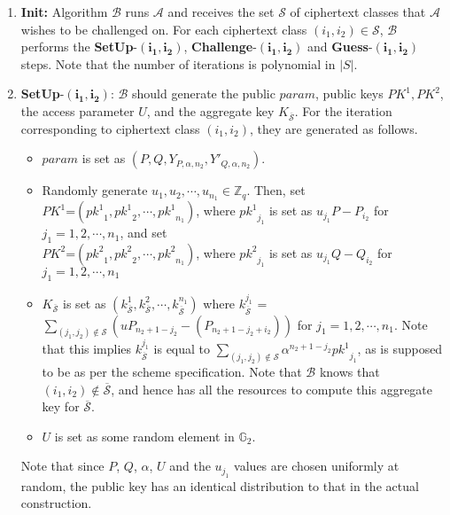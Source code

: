 \begin{enumerate}
 \item \textbf{Init:} Algorithm $\mathcal{B}$ runs $\mathcal{A}$ and receives the set $\mathcal{S}$ of ciphertext classes that $\mathcal{A}$ wishes to be challenged on. For each ciphertext class $(i_1,i_2)\in\mathcal{S}$, $\mathcal{B}$ performs the \textbf{SetUp}-$\mathbf{(i_1,i_2)}$, \textbf{Challenge}-$\mathbf{(i_1,i_2)}$ and \textbf{Guess}-$\mathbf{(i_1,i_2)}$ steps. Note that the number of iterations is polynomial in $|S|$. 
 
 \item \textbf{SetUp}-$\mathbf{(i_1,i_2)}$: $\mathcal{B}$ should generate the public $param$, public keys $PK^1,PK^2$, the access parameter $U$, and the aggregate key $K_{\overline{\mathcal{S}}}$. For the iteration corresponding to ciphertext class $(i_1,i_2)$, they are generated as follows.
 \begin{itemize}
  \item $param$ is set as $(P,Q,Y_{P,\alpha,n_2},Y'_{Q,\alpha,n_2})$.
  \item Randomly generate $u_1,u_2,\cdots,u_{n_1} \in \mathbb{Z}_q$. Then, set\\ $PK^1$=$({pk^1}_1,{pk^1}_2,\cdots,{pk^1}_{n_1})$, where ${pk^1}_{j_1}$ is set as $u_{j_1}P - P_{i_2}$ for $j_1=1,2,\cdots,n_1$, and set\\ $PK^2$=$({pk^2}_1,{pk^2}_2,\cdots,{pk^2}_{n_1})$, where ${pk^2}_{j_1}$ is set as $u_{j_1}Q - Q_{i_2}$ for $j_1=1,2,\cdots,n_1$
  \item $K_{\overline{\mathcal{S}}}$ is set as $(k^{1}_{\overline{\mathcal{S}}},k^{2}_{\overline{\mathcal{S}}},\cdots,k^{n_1}_{\overline{\mathcal{S}}})$ where $k^{j_1}_{\overline{\mathcal{S}}}$ = $\sum_{(j_1,j_2)\notin\mathcal{S}}({u}P_{n_2+1-j_2}-(P_{n_2+1-j_2+i_2}))$ for $j_1=1,2,\cdots,n_1$. Note that this implies $k^{j_1}_{\overline{\mathcal{S}}}$ is equal to $\sum_{(j_1,j_2)\notin\mathcal{S}}\alpha^{n_2+1-j_2}{pk^{1}}_{j_1}$, as is supposed to be as per the scheme specification. Note that $\mathcal{B}$ knows that $(i_1,i_2)\notin \overline{\mathcal{S}}$, and hence has all the resources to compute this aggregate key for $\overline{\mathcal{S}}$. 
  \item $U$ is set as some random element in $\mathbb{G}_2$.
 \end{itemize}
 
 Note that since $P$, $Q$, $\alpha$, $U$ and the $u_{j_1}$ values are chosen uniformly at random, the public key has an identical distribution to that in the actual construction.
 

\end{enumerate}
